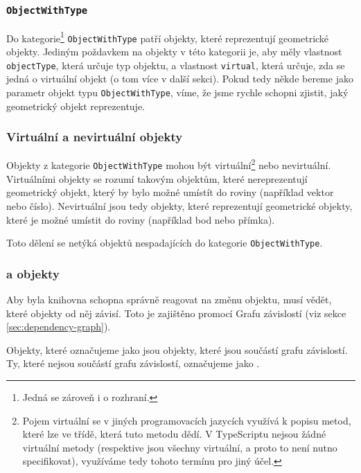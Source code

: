 \subsubsection[ObjectWithType]{\texttt{ObjectWithType}}
\label{subsubsec:object-with-type}

Do kategorie\footnote{Jedná se zároveň i o rozhraní.} \texttt{ObjectWithType} patří objekty, které reprezentují geometrické objekty. 
Jediným poždavkem na objekty v této kategorii je, aby měly vlastnost \texttt{objectType}, která určuje typ objektu, a vlastnost \texttt{virtual}, která určuje, zda se jedná o virtuální objekt (o tom více v další sekci).
Pokud tedy někde bereme jako parametr objekt typu \texttt{ObjectWithType}, víme, že jsme rychle schopni zjistit, jaký geometrický objekt reprezentuje.

\subsubsection[Virtuální a nevirtuální]{Virtuální a nevirtuální objekty}
\label{subsubsec:virtual-and-non-virtual}

Objekty z kategorie \texttt{ObjectWithType} mohou být virtuální\footnote{Pojem virtuální se v jiných programovacích jazycích využívá k popisu metod, které lze  ve třídě, která tuto metodu dědí. V TypeScriptu nejsou žádné virtuální metody (respektive jsou všechny virtuální, a proto to není nutno specifikovat), využíváme tedy tohoto termínu pro jiný účel.} nebo nevirtuální.
Virtuálními objekty se rozumí takovým objektům, které nereprezentují geometrický objekt, který by bylo možné umístít do roviny (například vektor nebo číslo).
Nevirtuální jsou tedy objekty, které reprezentují geometrické objekty, které je možné umístit do roviny (například bod nebo přímka).

Toto dělení se netýká objektů nespadajících do kategorie \texttt{ObjectWithType}.

\subsubsection[Bound a Unbound]{ a  objekty}
\label{subsubsec:bound-and-unbound}

Aby byla knihovna schopna správně reagovat na změnu objektu, musí vědět, které objekty od něj závisí.
Toto je zajištěno promocí Grafu závislostí (viz sekce \ref{sec:dependency-graph}).

Objekty, které označujeme jako  jsou objekty, které jsou součástí grafu závislostí.
Ty, které nejsou součástí grafu závislostí, označujeme jako .

